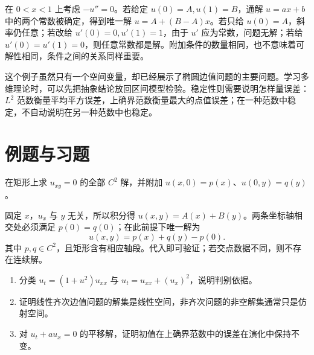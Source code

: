 \begin{example}[用最简单的问题区分存在性与唯一性]
在 $0<x<1$ 上考虑 $-u''=0$。若给定 $u(0)=A,u(1)=B$，通解 $u=ax+b$ 中的两个常数被确定，得到唯一解 $u=A+(B-A)x$。若只给 $u(0)=A$，斜率仍任意；若改给 $u'(0)=0,u'(1)=1$，由于 $u'$ 应为常数，问题无解；若给 $u'(0)=u'(1)=0$，则任意常数都是解。附加条件的数量相同，也不意味着可解性相同，条件之间的关系同样重要。
\end{example}

这个例子虽然只有一个空间变量，却已经展示了椭圆边值问题的主要问题。学习多维理论时，可以先把抽象结论放回区间模型检验。稳定性则需要说明怎样量误差：$L^2$ 范数衡量平均平方误差，上确界范数衡量最大的点值误差；在一种范数中稳定，不自动说明在另一种范数中也稳定。

\section{例题与习题}
\begin{example}
在矩形上求 $u_{xy}=0$ 的全部 $C^2$ 解，并附加 $u(x,0)=p(x)$、$u(0,y)=q(y)$。
\end{example}
\begin{solve}
固定 $x$，$u_x$ 与 $y$ 无关，所以积分得 $u(x,y)=A(x)+B(y)$。两条坐标轴相交处必须满足 $p(0)=q(0)$；在此前提下唯一解为
\[
 u(x,y)=p(x)+q(y)-p(0).
\]
其中 $p,q\in C^2$，且矩形含有相应轴段。代入即可验证；若交点数据不同，则不存在连续解。
\end{solve}
\begin{enumerate}
 \item 分类 $u_t=(1+u^2)u_{xx}$ 与 $u_t=u_{xx}+(u_x)^2$，说明判别依据。
 \item 证明线性齐次边值问题的解集是线性空间，非齐次问题的非空解集通常只是仿射空间。
 \item 对 $u_t+a u_x=0$ 的平移解，证明初值在上确界范数中的误差在演化中保持不变。
\end{enumerate}

